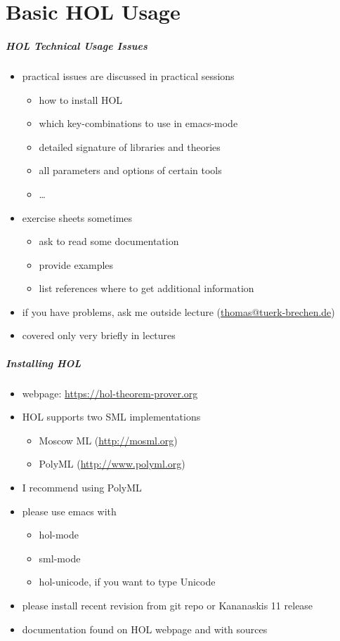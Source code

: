 \part{Basic HOL Usage}

\frame[plain]{\partpage}

\begin{frame}
\frametitle{HOL Technical Usage Issues}
\begin{itemize}
\item practical issues are discussed in practical sessions
\begin{itemize}
\item how to install HOL
\item which key-combinations to use in emacs-mode
\item detailed signature of libraries and theories
\item all parameters and options of certain tools
\item \ldots
\end{itemize}
\item exercise sheets sometimes
\begin{itemize}
\item ask to read some documentation
\item provide examples
\item list references where to get additional information
\end{itemize}
\item if you have problems, ask me outside lecture (\href{mailto:thomas@tuerk-brechen.de}{thomas@tuerk-brechen.de})
\item covered only very briefly in lectures
\end{itemize}
\end{frame}


\begin{frame}
\frametitle{Installing HOL}
\begin{itemize}
\item webpage: \url{https://hol-theorem-prover.org}
\item HOL supports two SML implementations
\begin{itemize}
\item Moscow ML (\url{http://mosml.org})
\item \alert{PolyML} (\url{http://www.polyml.org})
\end{itemize}
\item I recommend using PolyML
\item please use emacs with
\begin{itemize}
\item hol-mode
\item sml-mode
\item hol-unicode, if you want to type Unicode 
\end{itemize}
\item please install recent revision from git repo or Kananaskis 11 release
\item documentation found on HOL webpage and with sources
\end{itemize}
\end{frame}


